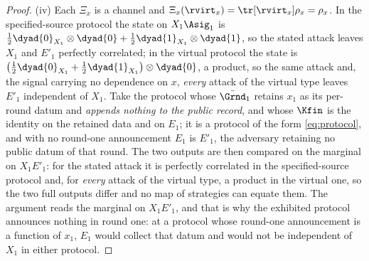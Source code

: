 \begin{proof}
(iv) Each $\Xi_x$ is a channel and $\Xi_x(\rvirt_x)=\tr[\rvirt_x]\rho_x=\rho_x$.
In the specified-source protocol the state on $X_1\Asig_1$ is
$\tfrac12\dyad{0}_{X_1}\otimes\dyad{0}+\tfrac12\dyad{1}_{X_1}\otimes\dyad{1}$,
so the stated attack leaves $X_1$ and $E'_1$ perfectly correlated; in the
virtual protocol the state is
$\big(\tfrac12\dyad{0}_{X_1}+\tfrac12\dyad{1}_{X_1}\big)\otimes\dyad{0}$, a
product, so the same attack and, the signal carrying no dependence on $x$,
\emph{every} attack of the virtual type leaves $E'_1$ independent of $X_1$.
Take the protocol whose $\bar{\Grnd}_1$ retains $x_1$ as its per-round datum and
\emph{appends nothing to the public record}, and whose $\Kfin$ is the identity
on the retained data and on $E_1$; it is a protocol of the form
\eqref{eq:protocol}, and with no round-one announcement $E_1$ is $E'_1$, the
adversary retaining no public datum of that round. The two outputs are then
compared on the marginal on $X_1E'_1$: for the stated attack it is
perfectly correlated in the specified-source protocol and, for \emph{every}
attack of the virtual type, a product in the virtual one, so the two full
outputs differ and no map of strategies can equate them. The argument reads
the marginal on $X_1E'_1$, and that is why the exhibited protocol announces
nothing in round one: at a protocol whose round-one announcement is a
function of $x_1$, $E_1$ would collect that datum and would not be
independent of $X_1$ in either protocol.
\end{proof}
